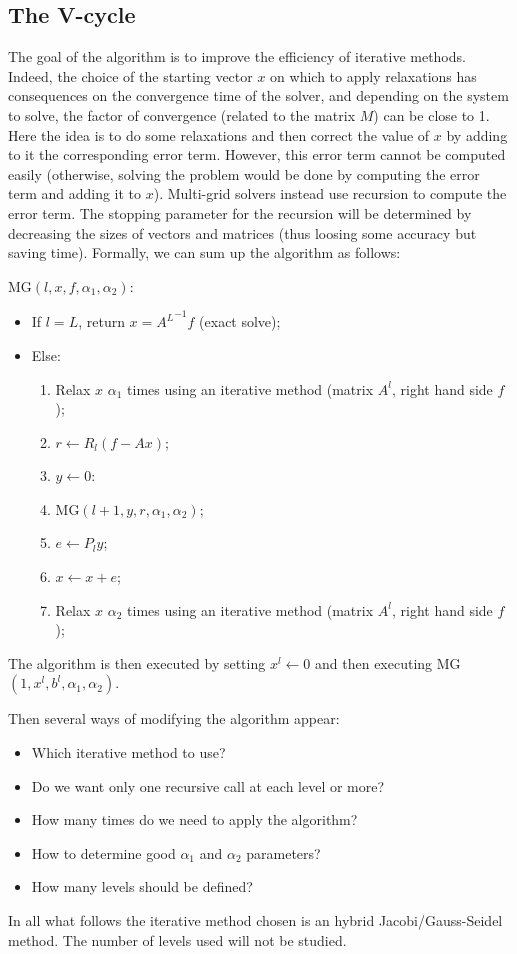 \subsection{The V-cycle}

  The goal of the algorithm is to improve the efficiency of iterative methods. Indeed, the choice of the starting vector $x$ on which to apply relaxations has consequences on the convergence
  time of the solver, and depending on the system to solve, the factor of convergence (related to the matrix $M$) can be close to 1.\\
  Here the idea is to do some relaxations and then correct the value of $x$ by adding to it the corresponding error term. However, this error term cannot be computed easily (otherwise,
  solving the problem would be done by computing the error term and adding it to $x$). Multi-grid solvers instead use recursion to compute the error term. The stopping parameter for the
  recursion will be determined by decreasing the sizes of vectors and matrices (thus loosing some accuracy but saving time).
  Formally, we can sum up the algorithm as follows:
  
  MG$(l,x,f,\alpha_1,\alpha_2)$:
  \begin{itemize}
    \item If $l = L$, return $x = {A^L}^{-1} f$ (exact solve);
    \item Else:
    \begin{enumerate}
      \item Relax $x$ $\alpha_1$ times using an iterative method (matrix $A^l$, right hand side $f$);
      \item $r \leftarrow R_l ( f - Ax )$;
      \item $y \leftarrow 0$:
      \item MG$(l+1,y,r,\alpha_1,\alpha_2)$;
      \item $e \leftarrow P_{l} y$;
      \item $x \leftarrow x+e$;
      \item Relax $x$ $\alpha_2$ times using an iterative method (matrix $A^l$, right hand side $f$);
   \end{enumerate}
  \end{itemize}
  The algorithm is then executed by setting $x^l \leftarrow 0$ and then executing MG$(1,x^l,b^l,\alpha_1,\alpha_2)$.

  Then several ways of modifying the algorithm appear:
  \begin{itemize}
   \item Which iterative method to use?
   \item Do we want only one recursive call at each level or more?
   \item How many times do we need to apply the algorithm?
   \item How to determine good $\alpha_1$ and $\alpha_2$ parameters?
   \item How many levels should be defined?
  \end{itemize}

  In all what follows the iterative method chosen is an hybrid Jacobi/Gauss-Seidel method. The number of levels used will not be studied.
